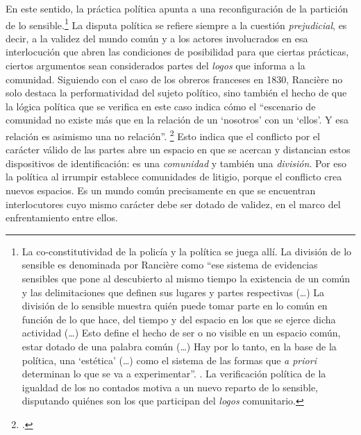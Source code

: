 En este sentido, la práctica política apunta a una reconfiguración de la partición de lo sensible.\footnote{La co-constitutividad de la policía y la política se juega allí. La división de lo sensible es denominada por Rancière como \enquote{ese sistema de evidencias sensibles que pone al descubierto al mismo tiempo la existencia de un común y las delimitaciones que definen sus lugares y partes respectivas (\ldots)  La división de lo sensible muestra quién puede tomar parte en lo común en función de lo que hace, del tiempo y del espacio en los que se ejerce dicha actividad (\ldots)  Esto define el hecho de ser o no visible en un espacio común, estar dotado de una palabra común (\ldots)  Hay por lo tanto, en la base de la política, una \enquote{estética}  (\ldots)  como el sistema de las formas que \emph{a priori} determinan lo que se va a experimentar}. \cite[][15]{@7085-RANCIERE2002}. La verificación política de la igualdad de los no contados motiva a un nuevo reparto de lo sensible, disputando quiénes son los que participan del \emph{logos} comunitario.} La disputa política se refiere siempre a la cuestión \emph{prejudicial}, es decir, a la validez del mundo común y a los actores involucrados en esa interlocución que abren las condiciones de posibilidad para que ciertas prácticas, ciertos argumentos sean considerados partes del \emph{logos} que informa a la comunidad. Siguiendo con el caso de los obreros franceses en 1830, Rancière no solo destaca la performatividad del sujeto político, sino también el hecho de que la lógica política que se verifica en este caso indica cómo el \enquote{escenario de comunidad no existe más que en la relación de un \enquote{nosotros} con un \enquote{ellos}. Y esa relación es asimismo una no relación}. \footcite[][74]{@7064-RANCIERE2010} Esto indica que el conflicto por el carácter válido de las partes abre un espacio en que se acercan y distancian estos dispositivos de identificación: es una \emph{comunidad} y también una \emph{división}. Por eso la política al irrumpir establece comunidades de litigio, porque el conflicto crea nuevos espacios. Es un mundo común precisamente en que se encuentran interlocutores cuyo mismo carácter debe ser dotado de validez, en el marco del enfrentamiento entre ellos.

